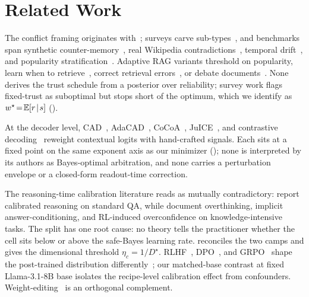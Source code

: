 \section{Related Work}
\label{sec:related}

The conflict framing originates with~\citet{longpre2021entity}; surveys carve sub-types~\citep{xu2024knowledgeconflicts,xie2024conflictqa}, and benchmarks span synthetic counter-memory~\citep{su2024conflictbank}, real Wikipedia contradictions~\citep{hou2024wikicontradict}, temporal drift~\citep{marjanovic2024dynamicqa}, and popularity stratification~\citep{mallen2023popqa}. Adaptive RAG variants threshold on popularity, learn when to retrieve~\citep{asai2024selfrag,jiang2023flare}, correct retrieval errors~\citep{yan2024crag}, or debate documents~\citep{wang2024astuterag,wang2025ramdocs}. None derives the trust schedule from a posterior over reliability; survey work flags fixed-trust as suboptimal but stops short of the optimum, which we identify as $w^\star\!=\!\mathbb{E}[r\!\mid\!s]$ ().

At the decoder level, CAD~\citep{shi2024cad}, AdaCAD~\citep{wang2025adacad}, CoCoA~\citep{khandelwal2025cocoa}, JuICE~\citep{li2025taming}, and contrastive decoding~\citep{li2023contrastive} reweight contextual logits with hand-crafted signals. Each sits at a fixed point on the same exponent axis as our minimizer (); none is interpreted by its authors as Bayes-optimal arbitration, and none carries a perturbation envelope or a closed-form readout-time correction.

The reasoning-time calibration literature reads as mutually contradictory: \citet{kadavath2022,yoon2025confidence} report calibrated reasoning on standard QA, while \citet{halawi2024overthinking,lacombe2025dontthinktwice,welch2026cost,damani2025rlcr,bereket2025grpo,sun2025context} document overthinking, implicit answer-conditioning, and RL-induced overconfidence on knowledge-intensive tasks. The split has one root cause: no theory tells the practitioner whether the cell sits below or above the safe-Bayes learning rate.  reconciles the two camps and  gives the dimensional threshold $\eta_c\!=\!1/D^\star$. RLHF~\citep{christiano2017rlhf,ouyang2022instructgpt}, DPO~\citep{rafailov2023dpo}, and GRPO~\citep{shao2024grpo} shape the post-trained distribution differently~\citep{pan2022reward}; our matched-base contrast at fixed Llama-3.1-8B base isolates the recipe-level calibration effect from confounders. Weight-editing~\citep{meng2022rome,meng2023memit} is an orthogonal complement.

